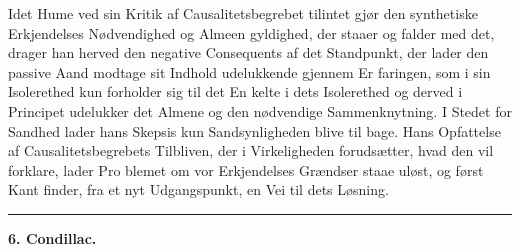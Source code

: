 \documentclass[12pt,a4paper]{book}
\newcommand{\divrule}{\begin{center}\rule{2cm}{0.4pt}\end{center}}
\begin{document}
Idet Hume ved sin Kritik af Causalitetsbegrebet tilintet\-%
gjør den synthetiske Erkjendelses Nødvendighed og Almeen\-%
gyldighed, der staaer og falder med det, drager han herved
den negative Consequents af det Standpunkt, der lader den
passive Aand modtage sit Indhold udelukkende gjennem Er\-%
faringen, som i sin Isolerethed kun forholder sig til det En\-%
kelte i dets Isolerethed og derved i Principet udelukker det
Almene og den nødvendige Sammenknytning. I Stedet for
Sandhed lader hans Skepsis kun Sandsynligheden blive til\-%
bage. Hans Opfattelse af Causalitetsbegrebets Tilbliven, der i
Virkeligheden forudsætter, hvad den vil forklare, lader Pro\-%
blemet om vor Erkjendelses Grændser staae uløst, og først
Kant finder, fra et nyt Udgangspunkt, en Vei til dets Løsning.

\divrule

\begin{center}
  \textbf{6. Condillac.}
\end{center}

%
\end{document}
